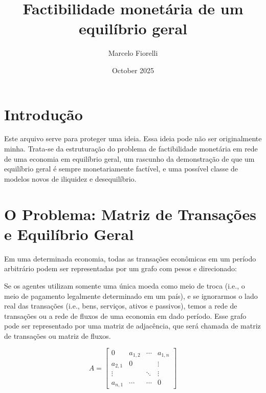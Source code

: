 \documentclass{article}
\title{Factibilidade monetária de um equilíbrio geral}
\author{Marcelo Fiorelli}
\date{October 2025}
\begin{document}
\maketitle
\section{Introdução}
\par Este arquivo serve para proteger uma ideia. Essa ideia pode não ser originalmente minha. Trata-se da estruturação do problema de factibilidade monetária em rede de uma economia em equilíbrio geral, um rascunho da demonstração de que um equilíbrio geral é sempre monetariamente factível, e uma possível classe de modelos novos de iliquidez e desequilíbrio.

\section{O Problema: Matriz de Transações e Equilíbrio Geral}
\par Em uma determinada economia, todas as transações econômicas em um período arbitrário podem ser representadas por um grafo com pesos e direcionado:


\par Se os agentes utilizam somente uma única moeda como meio de troca (i.e., o meio de pagamento legalmente determinado em um país), e se ignorarmos o lado real das transações (i.e., bens, serviços, ativos e passivos), temos a rede de transações ou a rede de fluxos de uma economia em dado período. Esse grafo pode ser representado por uma matriz de adjacência, que será chamada de matriz de transações ou matriz de fluxos. 

$$ A =
\begin{bmatrix}
 0&     a_{1,2}   &    \cdots    & a_{1,n} \\
 a_{2,1} & 0     &        &  \vdots \\
 \vdots &        & \ddots & \vdots  \\
a_{n,1} &   \cdots     &   \cdots     & 0
\end{bmatrix}
$$
\end{document}
